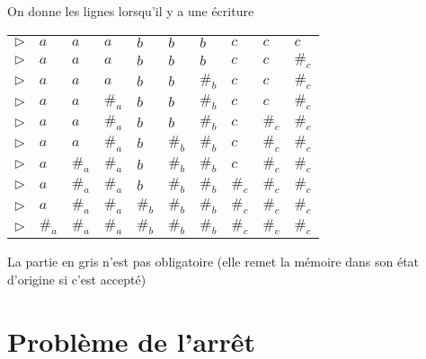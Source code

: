 \documentclass{article}
\theoremstyle{plain}
\theoremstyle{nonumberplain}
\begin{document}
  On donne les lignes lorsqu'il y a une écriture\\
  \begin{tabular}{llllllllll}
    $\triangleright$  & $a$ & $a$ & $a$ & $b$ & $b$ & $b$ & $c$ & $c$ & $c$ \\
    $\triangleright$  & $a$ & $a$ & $a$ & $b$ & $b$ & $b$ & $c$ & $c$ & $\#_c$ \\  
    $\triangleright$  & $a$ & $a$ & $a$ & $b$ & $b$ & $\#_b$ & $c$ & $c$ & $\#_c$ \\
    $\triangleright$  & $a$ & $a$ & $\#_a$ & $b$ & $b$ & $\#_b$ & $c$ & $c$ & $\#_c$ \\
    $\triangleright$  & $a$ & $a$ & $\#_a$ & $b$ & $b$ & $\#_b$ 
                      & $c$ & $\#_c$ & $\#_c$ \\  
    $\triangleright$  & $a$ & $a$ & $\#_a$ & $b$ & $\#_b$ 
                      & $\#_b$ & $c$ & $\#_c$ & $\#_c$ \\
    $\triangleright$  & $a$ & $\#_a$ & $\#_a$ & $b$ 
                      & $\#_b$ & $\#_b$ & $c$ & $\#_c$ & $\#_c$ \\
    $\triangleright$  & $a$ & $\#_a$ & $\#_a$ & $b$ & $\#_b$ & $\#_b$ 
                      & $\#_c$ & $\#_c$ & $\#_c$ \\  
    $\triangleright$  & $a$ & $\#_a$ & $\#_a$ & $\#_b$ & $\#_b$ 
                      & $\#_b$ & $\#_c$ & $\#_c$ & $\#_c$ \\
    $\triangleright$  & $\#_a$ & $\#_a$ & $\#_a$ & $\#_b$ 
                      & $\#_b$ & $\#_b$ & $\#_c$ & $\#_c$ & $\#_c$ \\
  \end{tabular}

  La partie en gris n'est pas obligatoire (elle remet la mémoire dans 
  son état d'origine si c'est accepté)


\newpage
\section{Problème de l'arrêt}
\end{document}
